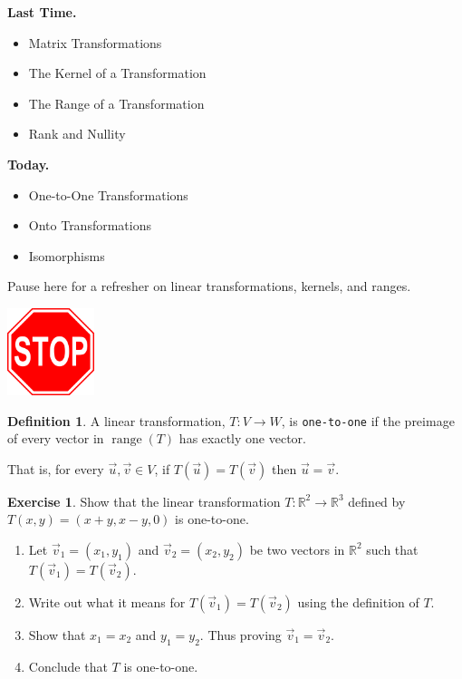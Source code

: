 \documentclass{beamer}
\newcommand{\R}{\mathbb{R}}
\newcommand{\fn}{\insertframenumber}
\theoremstyle{definition}
\newtheorem{exercise}{Exercise}
\newtheorem*{defn}{Definition}
\renewcommand{\emph}[1]{{\color{blue}\texttt{#1}}}
\begin{document}
\begin{frame}{\insertframenumber}
	\begin{block}{\textbf{Last Time.}}
	\begin{itemize}[label=--]
		\item Matrix Transformations
		\item The Kernel of a Transformation
		\item The Range of a Transformation
		\item Rank and Nullity
	\end{itemize}
	\end{block}
	\begin{block}{\textbf{Today.}}
		\begin{itemize}[label=--]
			\item One-to-One Transformations
			\item Onto Transformations
			\item Isomorphisms
		\end{itemize}
	\end{block}
\end{frame}
\begin{frame}{\fn}
	Pause here for a refresher on linear transformations, kernels, and ranges.
	\begin{center}
		\includegraphics[width=1in]{images/stop}
	\end{center}
\end{frame}
\begin{frame}{\fn}
	\begin{defn}
		A linear transformation, $T\colon V\to W$, is \emph{one-to-one} if the preimage of every vector in $\operatorname{range}(T)$ has exactly one vector.
		
		That is, for every $\vec u, \vec v\in V$, if $T(\vec u)=T(\vec v)$ then $\vec u=\vec v$.
	\end{defn}
	\begin{exercise}
		Show that the linear transformation $T: \R^2\to \R^3$ defined by $T(x,y)=(x+y,x-y,0)$ is one-to-one.
			\begin{enumerate}[label=(\alph*)]
				\item Let $\vec v_1=(x_1,y_1)$ and $\vec v_2=(x_2,y_2)$ be two vectors in $\R^2$ such that $T(\vec v_1)=T(\vec v_2)$.
				\item Write out what it means for $T(\vec v_1)=T(\vec v_2)$ using the definition of $T$.
				\item Show that $x_1=x_2$ and $y_1=y_2$.  Thus proving $\vec v_1=\vec v_2$.
				\item Conclude that $T$ is one-to-one.
			\end{enumerate}
	\end{exercise}
\end{frame}
\end{document}
